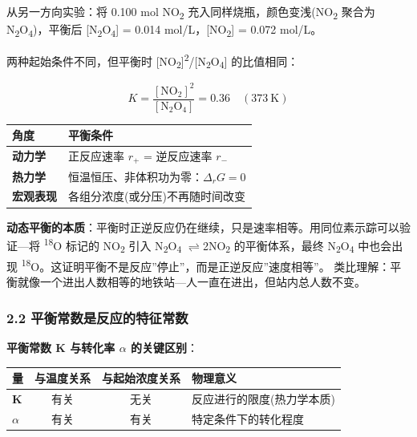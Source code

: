 \documentclass[a4paper,11pt]{ctexart}
\newcounter{none}
\newcommand{\箭}{\ensuremath{\rightarrow}}
\newcommand{\左箭}{\ensuremath{\leftarrow}}
\newcommand{\上箭}{\ensuremath{\uparrow}}
\newcommand{\下箭}{\ensuremath{\downarrow}}
\newcommand{\衡}{\ensuremath{\rightleftharpoons}}
\newcommand{\双箭}{\ensuremath{\leftrightarrow}}
\newcommand{\约等于}{\ensuremath{\approx}}
\newcommand{\小于等于}{\ensuremath{\leq}}
\newcommand{\大于等于}{\ensuremath{\geq}}
\newcommand{\不等于}{\ensuremath{\neq}}
\newcommand{\西格马}{\ensuremath{\sigma}}
\newcommand{\派}{\ensuremath{\pi}}
\begin{document}
从另一方向实验：将 0.100 mol NO\textsubscript{2} 充入同样烧瓶，颜色变浅(NO\textsubscript{2} 聚合为 N\textsubscript{2}O\textsubscript{4})，平衡后 {[}N\textsubscript{2}O\textsubscript{4}{]} = 0.014 mol/L，{[}NO\textsubscript{2}{]} = 0.072 mol/L。

两种起始条件不同，但平衡时 {[}NO\textsubscript{2}{]}\textsuperscript{2}/{[}N\textsubscript{2}O\textsubscript{4}{]} 的比值相同：

\[
K = \frac{[\mathrm{NO_2}]^2}{[\mathrm{N_2O_4}]} = 0.36 \quad (373\ \mathrm{K})
\]

{\def\LTcaptype{none} %
\begin{longtable}[]{@{}ll@{}}
\toprule\noalign{}
角度 & 平衡条件 \\
\midrule\noalign{}
\endhead
\bottomrule\noalign{}
\endlastfoot
\textbf{动力学} & 正反应速率 \(r_+\) = 逆反应速率 \(r_-\) \\
\textbf{热力学} & 恒温恒压、非体积功为零：\(\Delta_r G = 0\) \\
\textbf{宏观表现} & 各组分浓度(或分压)不再随时间改变 \\
\end{longtable}
}

\textbf{动态平衡的本质}：平衡时正逆反应仍在继续，只是速率相等。用同位素示踪可以验证---将 \textsuperscript{18}O 标记的 NO\textsubscript{2} 引入 N\textsubscript{2}O\textsubscript{4} \衡 2NO\textsubscript{2} 的平衡体系，最终 N\textsubscript{2}O\textsubscript{4} 中也会出现 \textsuperscript{18}O。这证明平衡不是反应''停止''，而是正逆反应''速度相等''。
类比理解：平衡就像一个进出人数相等的地铁站---人一直在进出，但站内总人数不变。

\subsubsection{2.2 平衡常数是反应的特征常数}\label{ux5e73ux8861ux5e38ux6570ux662fux53cdux5e94ux7684ux7279ux5f81ux5e38ux6570}

\textbf{平衡常数 K 与转化率 \(\alpha\) 的关键区别}：

{\def\LTcaptype{none} %
\begin{longtable}[]{@{}lccl@{}}
\toprule\noalign{}
量 & 与温度关系 & 与起始浓度关系 & 物理意义 \\
\midrule\noalign{}
\endhead
\bottomrule\noalign{}
\endlastfoot
\textbf{K} & 有关 & 无关 & 反应进行的限度(热力学本质) \\
\textbf{\(\alpha\)} & 有关 & 有关 & 特定条件下的转化程度 \\
\end{longtable}
}
\end{document}
